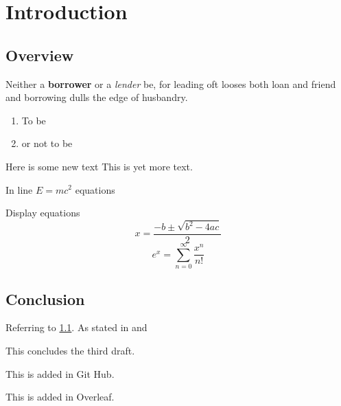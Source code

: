 \chapter{Introduction}

\section{Overview}
\label{Sec:Overview}

Neither a \textbf{borrower} or a \textit{lender} be, for leading oft looses both loan and friend and borrowing dulls the edge of husbandry.
\begin{enumerate}
\item To be
\item or not to be

\end{enumerate}

Here is some new text This is yet more text.

In line $E=mc^2$ equations

Display equations
\[
x=\frac{-b\pm\sqrt{b^2-4ac}}{2}
\]
\[
e^x = \sum_{n=0}^\infty\frac{x^n}{n!}
\]
\section{Conclusion}

Referring to \ref{Sec:Overview}. As stated in \cite[Section 2]{Bunce1992TheAlgebra} and \cite{Kaup1977AlgebraicBanachmanifolds}

This concludes the third draft.

This is added in Git Hub.

This is added in Overleaf.

